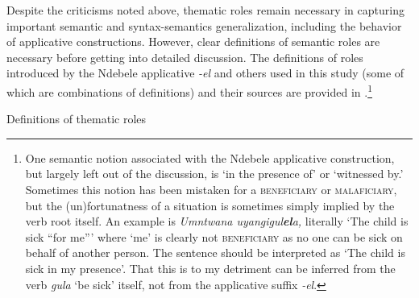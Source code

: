   Despite the criticisms noted above, thematic roles remain necessary in capturing important semantic and syntax-semantics generalization, including the behavior of applicative constructions. However, clear definitions of semantic roles are necessary before getting into detailed discussion. The definitions of roles introduced by the Ndebele applicative \textit{{}-el} and others used in this study (some of which are combinations of definitions) and their sources are provided in .\footnote{ One semantic notion associated with the Ndebele applicative construction, but largely left out of the discussion, is ‘in the presence of’ or ‘witnessed by.’ Sometimes this notion has been mistaken for a \textsc{beneficiary} or \textsc{malaficiary}, but the (un)fortunatness of a situation is sometimes simply implied by the verb root itself. An example is \textit{Umntwana uyangigul}\textbf{\textit{el}}\textit{a,} literally ‘The child is sick “for me”’ where ‘me’ is clearly not \textsc{beneficiary} as no one can be sick on behalf of another person. The sentence should be interpreted as ‘The child is sick in my presence’. That this is to my detriment can be inferred from the verb \textit{gula} ‘be sick’ itself, not from the applicative suffix \textit{{}-el}.} 

\begin{stylelsTableHeading}%
\begin{table}
\caption{Definitions of thematic roles}
\label{tab:1}
\end{table}\end{stylelsTableHeading}

